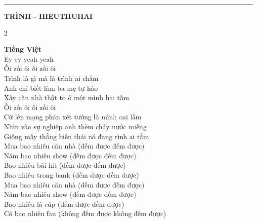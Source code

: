 
\vspace{0.55cm}
\hrule

\begin{center}
\textbf{TRÌNH - HIEUTHUHAI}
\end{center}

\begin{multicols*}{2}
\raggedright
\small

\textbf{Tiếng Việt} \\
\vspace{0.3em}
Ey ey yeah yeah \\
Ối zồi ôi ối zồi ôi \\
Trình là gì mà là trình ai chấm \\
Anh chỉ biết làm ba mẹ tự hào \\
Xây căn nhà thật to ở một mình hai tấm \\
Ối zồi ôi ối zồi ôi \\
Cứ lên mạng phán xét tưởng là mình oai lắm \\
Nhìn vào sự nghiệp anh thèm chảy nước miếng \\
Giống mấy thằng biến thái nó đang rình ai tắm \\
Mua bao nhiêu căn nhà (đếm được đếm được) \\
Năm bao nhiêu show (đếm được đếm được) \\
Bao nhiêu bài hit (đếm được đếm được) \\
Bao nhiêu trong bank (đếm được đếm được) \\
Mua bao nhiêu căn nhà (đếm được đếm được) \\
Năm bao nhiêu show (đếm được đếm được) \\
Bao nhiêu là cúp (đếm được đếm được) \\
Có bao nhiêu fan (không đếm được không đếm được)

\columnbreak


\end{multicols*}
